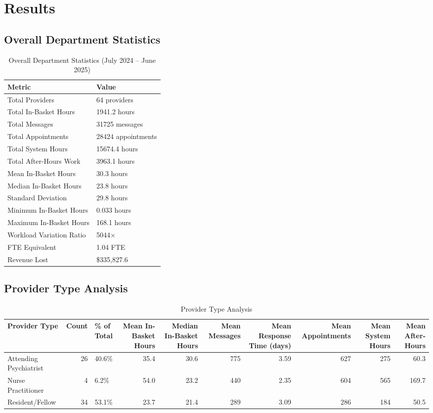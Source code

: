 \documentclass[
  11pt,
]{article}
\begin{document}
\section{Results}\label{results}

\subsection{Overall Department
Statistics}\label{overall-department-statistics}

\begin{longtable}[t]{ll}
\caption{\label{tab:overall-stats}Overall Department Statistics (July 2024 – June 2025)}\\
\toprule
Metric & Value\\
\midrule
Total Providers & 64 providers\\
Total In-Basket Hours & 1941.2 hours\\
Total Messages & 31725 messages\\
Total Appointments & 28424 appointments\\
Total System Hours & 15674.4 hours\\
\addlinespace
Total After-Hours Work & 3963.1 hours\\
Mean In-Basket Hours & 30.3 hours\\
Median In-Basket Hours & 23.8 hours\\
Standard Deviation & 29.8 hours\\
Minimum In-Basket Hours & 0.033 hours\\
\addlinespace
Maximum In-Basket Hours & 168.1 hours\\
Workload Variation Ratio & 5044×\\
FTE Equivalent & 1.04 FTE\\
Revenue Lost & \$335,827.6\\
\bottomrule
\end{longtable}

\subsection{Provider Type Analysis}\label{provider-type-analysis}

\begin{longtable}[t]{lrlrrrrrrr}
\caption{\label{tab:provider-type-analysis}Provider Type Analysis}\\
\toprule
Provider Type & Count & \% of Total & Mean In-Basket Hours & Median In-Basket Hours & Mean Messages & Mean Response Time (days) & Mean Appointments & Mean System Hours & Mean After-Hours\\
\midrule
Attending Psychiatrist & 26 & 40.6\% & 35.4 & 30.6 & 775 & 3.59 & 627 & 275 & 60.3\\
Nurse Practitioner & 4 & 6.2\% & 54.0 & 23.2 & 440 & 2.35 & 604 & 565 & 169.7\\
Resident/Fellow & 34 & 53.1\% & 23.7 & 21.4 & 289 & 3.09 & 286 & 184 & 50.5\\
\bottomrule
\end{longtable}
\end{document}
